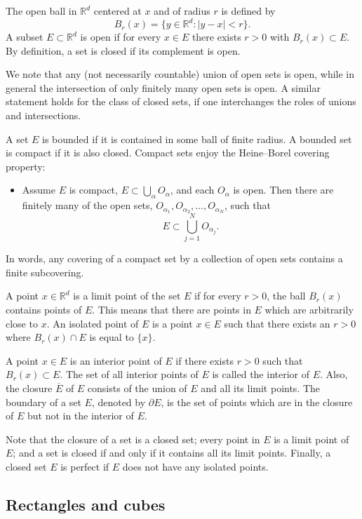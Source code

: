\documentclass[11pt,openany]{book}
\begin{document}
The open ball in $\mathbb{R}^d$ centered at $x$ and of radius $r$ is defined by
\[
 B_r(x)=\{y\in\mathbb{R}^d:|y-x|<r\}.
\]
A subset $E\subset\mathbb{R}^d$ is open if for every $x\in E$ there exists $r>0$ with $B_r(x)\subset E$. By definition, a set is closed if its complement is open.

We note that any (not necessarily countable) union of open sets is open, while in general the intersection of only finitely many open sets is open. A similar statement holds for the class of closed sets, if one interchanges the roles of unions and intersections.

A set $E$ is bounded if it is contained in some ball of finite radius. A bounded set is compact if it is also closed. Compact sets enjoy the Heine--Borel covering property:
\begin{itemize}
\item Assume $E$ is compact, $E\subset\bigcup_\alpha O_\alpha$, and each $O_\alpha$ is open. Then there are finitely many of the open sets, $O_{\alpha_1},O_{\alpha_2},\ldots,O_{\alpha_N}$, such that
\[
 E\subset\bigcup_{j=1}^N O_{\alpha_j}.
\]
\end{itemize}
In words, any covering of a compact set by a collection of open sets contains a finite subcovering.

A point $x\in\mathbb{R}^d$ is a limit point of the set $E$ if for every $r>0$, the ball $B_r(x)$ contains points of $E$. This means that there are points in $E$ which are arbitrarily close to $x$. An isolated point of $E$ is a point $x\in E$ such that there exists an $r>0$ where $B_r(x)\cap E$ is equal to $\{x\}$.

A point $x\in E$ is an interior point of $E$ if there exists $r>0$ such that $B_r(x)\subset E$. The set of all interior points of $E$ is called the interior of $E$. Also, the closure $\overline E$ of $E$ consists of the union of $E$ and all its limit points. The boundary of a set $E$, denoted by $\partial E$, is the set of points which are in the closure of $E$ but not in the interior of $E$.

Note that the closure of a set is a closed set; every point in $E$ is a limit point of $E$; and a set is closed if and only if it contains all its limit points. Finally, a closed set $E$ is perfect if $E$ does not have any isolated points.

\subsection*{Rectangles and cubes}
\end{document}
